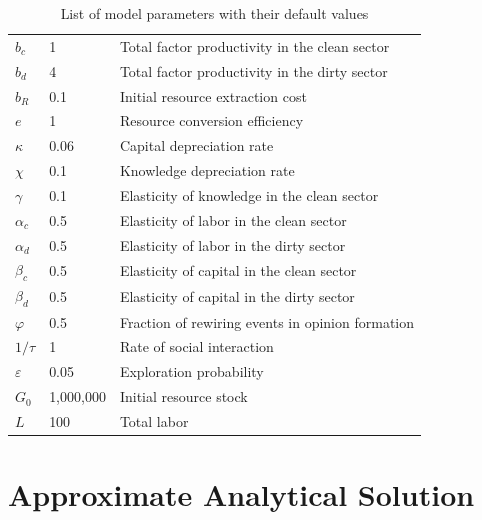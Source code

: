 \begin{table}
	\centering
	\begin{tabular}{l|l|l}
		\hline
		$b_c$ & 1 & Total factor productivity in the clean sector \\
		$b_d$ & 4 & Total factor productivity in the dirty sector \\
		$b_R$ & 0.1 & Initial resource extraction cost \\
		$e$   & 1 & Resource conversion efficiency \\
		$\kappa$   & 0.06 & Capital depreciation rate \\
		$\chi$      & 0.1 & Knowledge depreciation rate \\
		$\gamma$	   & 0.1 & Elasticity of knowledge in the clean sector \\
		$\alpha_c$ & 0.5 & Elasticity of labor in the clean sector \\
		$\alpha_d$ & 0.5 & Elasticity of labor in the dirty sector \\
		$\beta_c$ & 0.5 & Elasticity of capital in the clean sector \\
		$\beta_d$ & 0.5 & Elasticity of capital in the dirty sector \\
		$\varphi$ & 0.5 & Fraction of rewiring events in opinion formation \\
		$1/\tau$ & 1 & Rate of social interaction \\ 
		$\varepsilon$ & 0.05 & Exploration probability \\ 
                $G_0$ & 1,000,000 & Initial resource stock \\
        $L$ & 100 & Total labor \\ 
        \hline
	\end{tabular}
	\caption{List of model parameters with their default values}
	\label{tab:Parameter_list}
\end{table}

\section{Approximate Analytical Solution}
\label{sec:Approximation}

